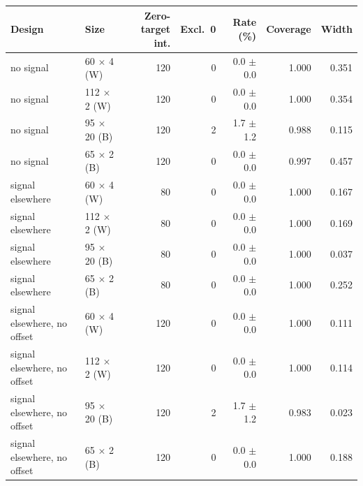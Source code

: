 \begin{tabular}{llrrrrr}
\toprule
Design & Size & Zero-target int. & Excl.\ 0 & Rate (\%) & Coverage & Width \\
\midrule
no signal & 60 $\times$ 4 (W) & 120 & 0 & 0.0 $\pm$ 0.0 & 1.000 & 0.351 \\
no signal & 112 $\times$ 2 (W) & 120 & 0 & 0.0 $\pm$ 0.0 & 1.000 & 0.354 \\
no signal & 95 $\times$ 20 (B) & 120 & 2 & 1.7 $\pm$ 1.2 & 0.988 & 0.115 \\
no signal & 65 $\times$ 2 (B) & 120 & 0 & 0.0 $\pm$ 0.0 & 0.997 & 0.457 \\
signal elsewhere & 60 $\times$ 4 (W) & 80 & 0 & 0.0 $\pm$ 0.0 & 1.000 & 0.167 \\
signal elsewhere & 112 $\times$ 2 (W) & 80 & 0 & 0.0 $\pm$ 0.0 & 1.000 & 0.169 \\
signal elsewhere & 95 $\times$ 20 (B) & 80 & 0 & 0.0 $\pm$ 0.0 & 1.000 & 0.037 \\
signal elsewhere & 65 $\times$ 2 (B) & 80 & 0 & 0.0 $\pm$ 0.0 & 1.000 & 0.252 \\
signal elsewhere, no offset & 60 $\times$ 4 (W) & 120 & 0 & 0.0 $\pm$ 0.0 & 1.000 & 0.111 \\
signal elsewhere, no offset & 112 $\times$ 2 (W) & 120 & 0 & 0.0 $\pm$ 0.0 & 1.000 & 0.114 \\
signal elsewhere, no offset & 95 $\times$ 20 (B) & 120 & 2 & 1.7 $\pm$ 1.2 & 0.983 & 0.023 \\
signal elsewhere, no offset & 65 $\times$ 2 (B) & 120 & 0 & 0.0 $\pm$ 0.0 & 1.000 & 0.188 \\
\bottomrule
\end{tabular}
